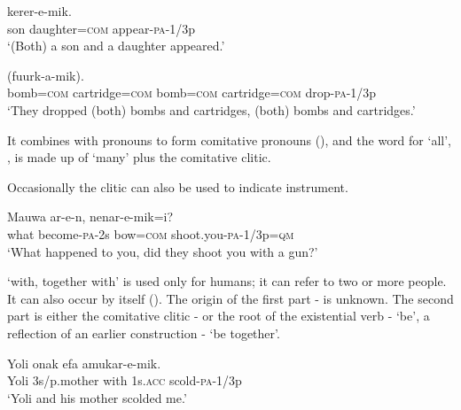 \ea%
\label{ex:x776}
\gll {}  kerer-e-mik. \\
son daughter=\textsc{com} appear-\textsc{pa}-1/3p\\
\glt`(Both) a son and a daughter appeared.'
\z

\ea%
\label{ex:x777}
\gll {}    (fuurk-a-mik). \\
bomb=\textsc{com} cartridge=\textsc{com} bomb=\textsc{com} cartridge=\textsc{com} drop-\textsc{pa}-1/3p\\
\glt`They dropped (both) bombs and cartridges, (both) bombs and cartridges.'
\z

It combines with pronouns to form comitative pronouns (), and the word for `all', , is made up of  `many' plus the comitative clitic.

Occasionally the clitic can also be used to indicate instrument. 

\ea%
\label{ex:x778}
\gll Mauwa ar-e-n,  nenar-e-mik=i? \\
what become-\textsc{pa}-2s bow=\textsc{com} shoot.you-\textsc{pa}-1/3p=\textsc{qm}\\
\glt`What happened to you, did they shoot you with a gun?'
\z

 `with, together with' is used only for humans; it can refer to two or more people. It can also occur by itself (). The origin of the first part - is unknown. The second part is either the comitative clitic - or the root of the existential verb \nobreakdash- `be', a reflection of an earlier construction \nobreakdash- `be together'. 

\ea%
\label{ex:x821}
\gll Yoli onak  efa amukar-e-mik. \\
Yoli 3s/p.mother with 1s.\textsc{acc} scold-\textsc{pa}-1/3p\\
\glt`Yoli and his mother scolded me.'
\z

